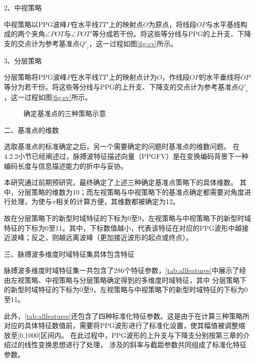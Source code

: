 2、中视策略

中视策略以PPG波峰$P$在水平线$TT'$上的映射点$O$为原点，将线段$OP$与水平基线构成的两个夹角$\angle POT$与$\angle POT'$等分成若干份。将这些等分线与PPG的上升支、下降支的交点计为参考基准点${Q'}_i$，这一过程如图\autoref{fig:cv}所示。

3、分层策略

分层策略将PPG波峰$P$在水平线$TT'$上的映射点计为$O$，作线段$OP$的水平垂线将$OP$等分为若干份。将这些等分线与PPG的上升支、下降支的交点计为参考基准点${Q'}_i$，这一过程如图\autoref{fig:sv}所示。

\begin{figure}[htbp]
  \centering
  \quad
  \quad
  \caption{\label{fig:all_views}确定基准点的三种策略示意}
\end{figure}

二、基准点的维数

选取基准点的标准确定之后，另一个需要确定的问题时基准点的维数问题。
在4.2.2小节已经阐述过，脉搏波特征描述向量（PPGFV）是在变换编码背景下一种编码长度与信息描述能力的折中与妥协。

本研究通过前期预研究，最终确定了上述三种确定基准点策略下的具体维数。
其中，分层策略的维数为10；而左视策略与中视策略下的基准点确定都需要对角度进行处理，为使与$\pi$相关的计算方便，其维数都被确定为12。

故在分层策略下的新型时域特征的下标为0至9，左视策略与中视策略下的新型时域特征的下标为0至11。其中，下标数值越小，代表该特征在对应的PPG波形中越接近波峰；反之，则越远离波峰（更加接近波形的起点或终点）。

三、脉搏波多维度时域特征集具体包含特征

脉搏波多维度时域特征集一共包含了286个特征参数，\autoref{tab:allfeatures}中展示了经由左视策略、中视策略与分层策略确定得到的多维度时域特征，其中
分层策略下的新型时域特征的下标为0至9，左视策略与中视策略下的新型时域特征的下标为0至11。

此外，\autoref{tab:allfeatures}还包含了四种标准化特征参数。这是由于在计算三种策略所对应的具体特征数值前，需要将PPG波形进行了标准化设置，使其幅值被调整缩放至[0,1000]区间内。
在此过程中，PPG波形的上升支与下降支分别按第三章的介绍过的线性变换思想进行了处理，
涉及的斜率与截距参数共同组成了标准化特征参数。

